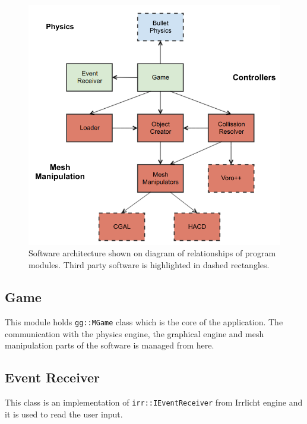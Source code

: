 \begin{figure}
        \centering
        \includegraphics[width=\textwidth]{img/objectmodel}
        \caption{Software architecture shown on diagram of relationships of program modules. Third party software is highlighted in dashed rectangles.}
        \label{fig:modules}
\end{figure}

\subsection*{Game}
This module holds {\tt gg::MGame} class which is the core of the application. The communication with the physics engine,  the graphical engine and mesh manipulation parts of the software is managed from here.

\subsection*{Event Receiver}
This class is an implementation of {\tt irr::IEventReceiver} from Irrlicht engine and it is used to read the user input.

